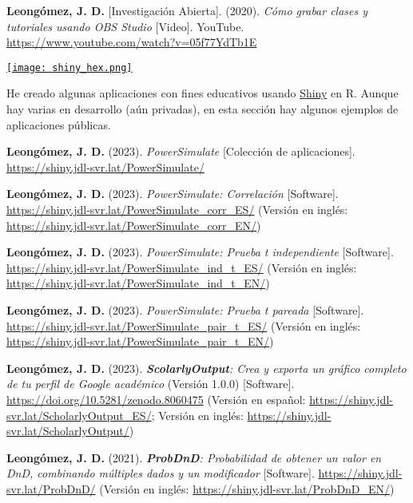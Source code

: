 \documentclass[11pt,a4paper,]{awesome-cv}
\begin{document}
\textbf{Leongómez, J. D.} {[}Investigación Abierta{]}. (2020).
\emph{Cómo grabar clases y tutoriales usando OBS Studio} {[}Video{]}.
YouTube. \url{https://www.youtube.com/watch?v=05f77YdTb1E}

\endgroup

\begin{minipage}[c]{0.10\linewidth}
\href{https://jdleongomez.info/es/#shiny}{\texttt{[image: shiny\_hex.png]}}
\end{minipage} \begin{minipage}[c]{0.90\linewidth} \begin{footnotesize}
He creado algunas aplicaciones con fines educativos usando \href{https://shiny.posit.co/}{Shiny} en R. Aunque hay varias en desarrollo (aún privadas), en esta sección hay algunos ejemplos de aplicaciones públicas.
\end{footnotesize}
\end{minipage}

\begingroup
\footnotesize
\setlength{\parindent}{-0.5in}
\setlength{\leftskip}{0.5in}

\textbf{Leongómez, J. D.} (2023). \emph{PowerSimulate} {[}Colección de
aplicaciones{]}. \url{https://shiny.jdl-svr.lat/PowerSimulate/}

\textbf{Leongómez, J. D.} (2023). \emph{PowerSimulate: Correlación}
{[}Software{]}. \url{https://shiny.jdl-svr.lat/PowerSimulate_corr_ES/}
(Versión en inglés:
\url{https://shiny.jdl-svr.lat/PowerSimulate_corr_EN/})

\textbf{Leongómez, J. D.} (2023). \emph{PowerSimulate: Prueba t
independiente} {[}Software{]}.
\url{https://shiny.jdl-svr.lat/PowerSimulate_ind_t_ES/} (Versión en
inglés: \url{https://shiny.jdl-svr.lat/PowerSimulate_ind_t_EN/})

\textbf{Leongómez, J. D.} (2023). \emph{PowerSimulate: Prueba t pareada}
{[}Software{]}. \url{https://shiny.jdl-svr.lat/PowerSimulate_pair_t_ES/}
(Versión en inglés:
\url{https://shiny.jdl-svr.lat/PowerSimulate_pair_t_EN/})

\textbf{Leongómez, J. D.} (2023). \emph{\textbf{ScolarlyOutput}: Crea y
exporta un gráfico completo de tu perfil de Google académico} (Versión
1.0.0) {[}Software{]}.
\href{https://shiny.jdl-svr.lat/ScholarlyOutput/}{https://doi.org/10.5281/zenodo.8060475}
(Versión en español:
\url{https://shiny.jdl-svr.lat/ScholarlyOutput_ES/}; Versión en inglés:
\url{https://shiny.jdl-svr.lat/ScholarlyOutput/})

\textbf{Leongómez, J. D.} (2021). \emph{\textbf{ProbDnD}: Probabilidad
de obtener un valor en DnD, combinando múltiples dados y un modificador}
{[}Software{]}. \url{https://shiny.jdl-svr.lat/ProbDnD/} (Versión en
inglés: \url{https://shiny.jdl-svr.lat/ProbDnD_EN/})
\end{document}
